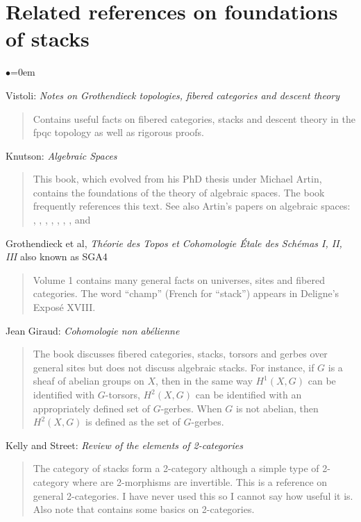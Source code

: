 \section{Related references on foundations of stacks}
\label{section-related}


\begin{list}{$\bullet$}{\leftmargin=0em}
\item
Vistoli:
\emph{Notes on Grothendieck topologies, fibered categories and descent theory}
\cite{vistoli_fga}
\begin{quote}
Contains useful facts on fibered categories, stacks and descent theory in the
fpqc topology as well as rigorous proofs.
\end{quote}
\smallskip
\item{} Knutson: \emph{Algebraic Spaces} \cite{Kn}
\begin{quote}
This book, which evolved from his PhD thesis under Michael Artin,
contains the foundations of the theory of algebraic spaces. The book
\cite{LM-B} frequently references this text. See also Artin's papers on
algebraic spaces: \cite{Artin-Algebraic-Approximation},
\cite{ArtinI}, \cite{Artin-Implicit-Function},
\cite{ArtinII}, \cite{Artin-Construction-Techniques},
\cite{Artin-Algebraic-Spaces}, \cite{Artin-Theorem-Representability}, and
\cite{ArtinVersal}
\end{quote}
\smallskip
\item Grothendieck et al, \emph{Th\'eorie des Topos et Cohomologie \'Etale des
Sch\'emas I, II, III} also known as SGA4 \cite{SGA4}
\begin{quote}
Volume 1 contains many general facts on universes, sites and fibered
categories. The word ``champ'' (French for ``stack'') appears in
Deligne's Expos\'e XVIII.
\end{quote}
\smallskip
\item{} Jean Giraud: \emph{Cohomologie non ab\'elienne} \cite{giraud}
\begin{quote}
The book discusses fibered categories, stacks, torsors and gerbes over general
sites but does not discuss algebraic stacks. For instance, if $G$ is a sheaf
of abelian groups on $X$, then in the same way $H^1(X, G)$ can be identified
with $G$-torsors, $H^2(X, G)$ can be identified with an appropriately defined
set of $G$-gerbes. When $G$ is not abelian, then $H^2(X, G)$ is defined as the
set of $G$-gerbes.
\end{quote}
\smallskip
\item Kelly and Street: \emph{Review of the elements of 2-categories}
\cite{kelly-street}
\begin{quote}
The category of stacks form a 2-category although a simple type of 2-category
where are 2-morphisms are invertible. This is a reference on general
2-categories. I have never used this so I cannot say how useful it is. Also
note that \cite{stacks-project} contains some basics on 2-categories.
\end{quote}
\end{list}




